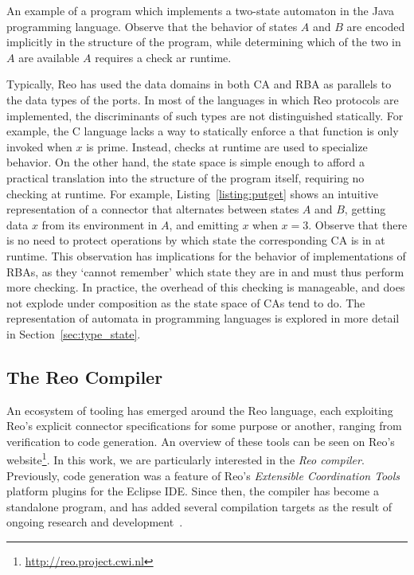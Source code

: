 \begin{listing}[ht]
	\inputminted[]{java}{putget.java}
	\caption[Type state automaton in Java.]{An example of a program which implements a two-state automaton in the Java programming language. Observe that the behavior of states $A$ and $B$ are encoded implicitly in the structure of the program, while determining which of the two in $A$ are available $A$ requires a check ar runtime.}
	\label{listing:putget}
\end{listing}
Typically, Reo has used the data domains in both CA and RBA as parallels to the data types of the ports. In most of the languages in which Reo protocols are implemented, the discriminants of such types are not distinguished statically. For example, the C language lacks a way to statically enforce a that function  is only invoked when $x$ is prime. Instead, checks at runtime are used to specialize behavior. On the other hand, the state space is simple enough to afford a practical translation into the structure of the program itself, requiring no checking at runtime. For example, Listing~\ref{listing:putget} shows an intuitive representation of a connector that alternates between states $A$ and $B$, getting data $x$ from its environment in $A$, and emitting $x$ when $x=3$. Observe that there is no need to protect operations by which state the corresponding CA is in at runtime. This observation has implications for the behavior of implementations of RBAs, as they `cannot remember' which state they are in and must thus perform more checking. In practice, the overhead of this checking is manageable, and does not explode under composition as the state space of CAs tend to do. The representation of automata in programming languages is explored in more detail in Section~\ref{sec:type_state}.

\subsection{The Reo Compiler}
An ecosystem of tooling has emerged around the Reo language, each exploiting Reo's explicit connector specifications for some purpose or another, ranging from verification to code generation. An overview of these tools can be seen on Reo's  website\footnote{\url{http://reo.project.cwi.nl}}. In this work, we are particularly interested in the \textit{Reo compiler}. Previously, code generation was a feature of Reo's \textit{Extensible Coordination Tools} platform plugins for the Eclipse IDE. Since then, the compiler has become a standalone program, and has added several compilation targets as the result of ongoing research and development~\cite{jongmans2012automatic, jongmans2015partially, dokter2018rule}.

